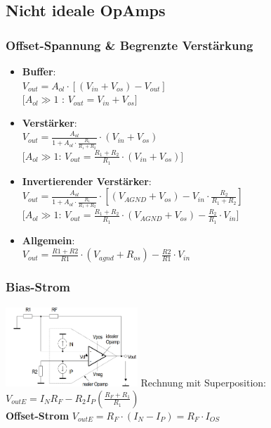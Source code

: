 \documentclass[margin=normal]{tex/hsrzf}
\begin{document}
\subsection{Nicht ideale OpAmps}
\begin{multicols}{2}
  \small
  \subsubsection*{Offset-Spannung \& Begrenzte Verstärkung}
  \begin{itemize}
    \item \textbf{Buffer}: \\
          $V_{out} = A_{ol} \cdot [(V_{in}+V_{os}) - V_{out}]$
          \\$[A_{ol}\gg 1$ : $V_{out} = V_{in} + V_{os}]$

    \item \textbf{Verstärker}: \\
          $V_{out} = \frac{A_{ol}}{1+A_{ol}\cdot\frac{R_1}{R_1+R_2}}\cdot(V_{in}+V_{os}) $
          \\$[A_{ol}\gg 1$: $V_{out} = \frac{R_1+R_2}{R_1}\cdot(V_{in}+V_{os})]$

    \item \textbf{Invertierender Verstärker}: \\
          $V_{out} = \frac{A_{ol}}{1+A_{ol}\cdot\frac{R_1}{R_1+R_2}}\cdot[(V_{AGND} + V_{os})-V_{in}\cdot\frac{R_2}{R_1+R_2}]$
          \\ $[A_{ol}\gg 1$: $V_{out} = \frac{R_1 + R_2}{R_1}\cdot(V_{AGND}+V_{os})-\frac{R_2}{R_1}\cdot V_{in}]$

    \item \textbf{Allgemein}: \\
          $V_{out} = \frac{R1 + R2}{R1}\cdot(V_{agnd}+R_{os})-\frac{R2}{R1}\cdot V_{in}$

  \end{itemize}
  \subsubsection*{Bias-Strom}
  \includegraphics[height=3cm]{img/OpAmp/Fehler_Eingangsstrom.png}
  \tiny{Rechnung mit Superposition:}\\
  $V_{out E} = I_NR_F-R_2I_P(\frac{R_F+R_1}{R_1}) $\\
  \textbf{Offset-Strom}
  $V_{out E} = R_F\cdot(I_N-I_P) = R_F\cdot I_{OS}$

\end{multicols}
\end{document}
